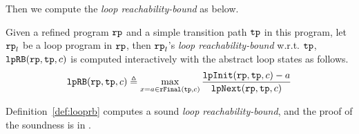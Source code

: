%
Then we compute the
\emph{loop reachability-bound} as below.
\begin{defn}
 \label{def:looprb}
 Given a refined program $\mathtt{rp}$ and a simple transition path $\mathtt{tp}$ in this program, 
 let $\mathtt{rp}_l$ be a loop program in $\mathtt{rp}$,
 then $\mathtt{rp}_l$'s \emph{loop reachability-bound} w.r.t. $\mathtt{tp}$, $\mathtt{lpRB}(\mathtt{rp}, \mathtt{tp}, c)$
 is computed interactively with the abstract loop states as follows. 
 \[
 \mathtt{lpRB}(\mathtt{rp}, \mathtt{tp}, c) \triangleq
 \max\limits_{x = a \in \mathtt{rFinal}(\mathtt{tp}, c)}
 \frac{\mathtt{lpInit}(\mathtt{rp}, \mathtt{tp}, c) - a }{\mathtt{lpNext}(\mathtt{rp}, \mathtt{tp}, c)}
 \]
\end{defn}
%
Definition~\ref{def:looprb} computes a sound \emph{loop reachability-bound}, and the proof of the soundness is in .


